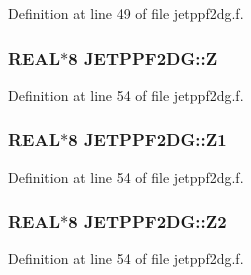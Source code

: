 Definition at line 49 of file jetppf2dg.f.\hypertarget{namespaceJETPPF2DG_e77dc9f382919eb823a6a004b79dec10}{
\subsubsection[Z]{\setlength{\rightskip}{0pt plus 5cm}REAL$\ast$8 {\bf JETPPF2DG::Z}}}
\label{namespaceJETPPF2DG_e77dc9f382919eb823a6a004b79dec10}




Definition at line 54 of file jetppf2dg.f.\hypertarget{namespaceJETPPF2DG_b51d877f8345dc64e86952fa279daa83}{
\subsubsection[Z1]{\setlength{\rightskip}{0pt plus 5cm}REAL$\ast$8 {\bf JETPPF2DG::Z1}}}
\label{namespaceJETPPF2DG_b51d877f8345dc64e86952fa279daa83}




Definition at line 54 of file jetppf2dg.f.\hypertarget{namespaceJETPPF2DG_dc17956d43608921538c64177125e1c4}{
\subsubsection[Z2]{\setlength{\rightskip}{0pt plus 5cm}REAL$\ast$8 {\bf JETPPF2DG::Z2}}}
\label{namespaceJETPPF2DG_dc17956d43608921538c64177125e1c4}




Definition at line 54 of file jetppf2dg.f.